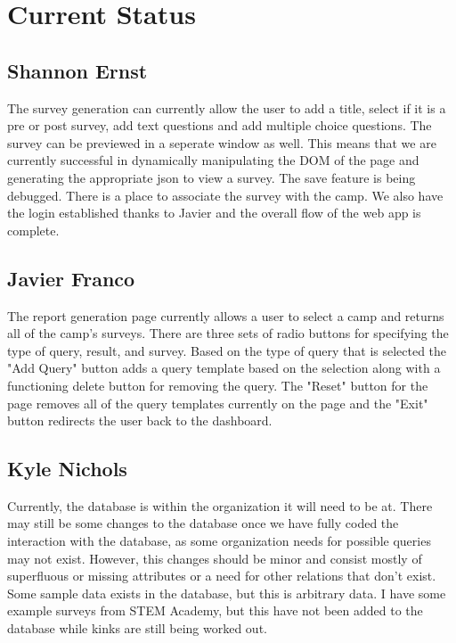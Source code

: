 \documentclass[letterpaper,10pt,serif, draftclsnofoot,onecolumn, compsoc, titlepage]{IEEEtran}
\begin{document}
\section{Current Status}

\subsection{Shannon Ernst}
The survey generation can currently allow the user to add a title, select if it is a pre or post survey, add text questions and add multiple choice questions. The survey can be previewed in a seperate window as well. This means that we are currently successful in dynamically manipulating the DOM of the page and generating the appropriate json to view a survey. The save feature is being debugged. There is a place to associate the survey with the camp. We also have the login established thanks to Javier and the overall flow of the web app is complete.  
\subsection{Javier Franco}
The report generation page currently allows a user to select a camp and returns all of the camp's surveys. There are three sets of radio buttons for specifying the type of query, result, and survey. Based on the type of query that is selected the "Add Query" button adds a query template based on the selection along with a functioning delete button for removing the query. The "Reset" button for the page removes all of the query templates currently on the page and the "Exit" button redirects the user back to the dashboard.

\subsection{Kyle Nichols}
Currently, the database is within the organization it will need to be at.
There may still be some changes to the database once we have fully coded the interaction with the database, as some organization needs for possible queries may not exist.
However, this changes should be minor and consist mostly of superfluous or missing attributes or a need for other relations that don't exist.
Some sample data exists in the database, but this is arbitrary data.
I have some example surveys from STEM Academy, but this have not been added to the database while kinks are still being worked out.
\end{document}
